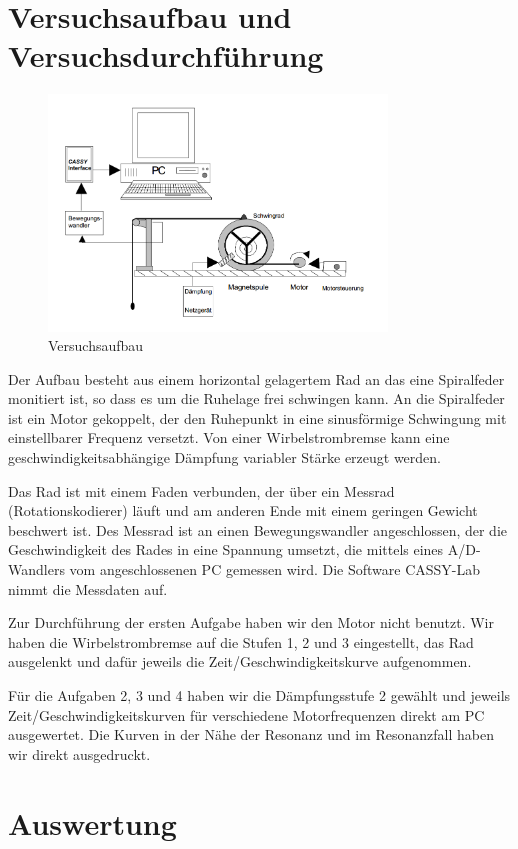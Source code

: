 \documentclass[a4paper,german,12pt,smallheadings]{scrartcl}
\begin{document}
\section{Versuchsaufbau und Versuchsdurchführung}
\begin{figure}
  \includegraphics[width=9cm]{aufbau.png}
  \caption{Versuchsaufbau}
\end{figure}
Der Aufbau besteht aus einem horizontal gelagertem Rad an das eine Spiralfeder
monitiert ist, so dass es um die Ruhelage frei schwingen kann. An die
Spiralfeder ist ein Motor gekoppelt, der den Ruhepunkt in eine sinusförmige
Schwingung mit einstellbarer Frequenz versetzt. Von einer Wirbelstrombremse
kann eine geschwindigkeitsabhängige Dämpfung variabler Stärke erzeugt werden.

Das Rad ist mit einem Faden verbunden, der über ein Messrad (Rotationskodierer)
läuft und am anderen Ende mit einem geringen Gewicht beschwert ist. Des Messrad
ist an einen Bewegungswandler angeschlossen, der die Geschwindigkeit des Rades
in eine Spannung umsetzt, die mittels eines A/D-Wandlers vom angeschlossenen PC
gemessen wird. Die Software CASSY-Lab nimmt die Messdaten auf.

Zur Durchführung der ersten Aufgabe haben wir den Motor nicht benutzt. Wir
haben die Wirbelstrombremse auf die Stufen 1, 2 und 3 eingestellt, das Rad
ausgelenkt und dafür jeweils die Zeit/Geschwindigkeitskurve aufgenommen.

Für die Aufgaben 2, 3 und 4 haben wir die Dämpfungsstufe 2 gewählt und jeweils
Zeit/Geschwindigkeitskurven für verschiedene Motorfrequenzen direkt am PC
ausgewertet. Die Kurven in der Nähe der Resonanz und im Resonanzfall haben wir
direkt ausgedruckt.

\section{Auswertung}
\end{document}
